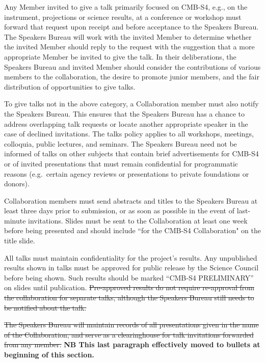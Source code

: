 \documentclass[12pt]{article}
\begin{document}
{\color{red}
Any Member invited to give a talk primarily focused on CMB-S4, e.g., on the instrument, projections or science results, at a conference or workshop must forward that request upon receipt and before acceptance to the Speakers Bureau.  The Speakers Bureau will work with the invited Member to determine whether the invited Member should reply to the request with the suggestion that a more appropriate Member be invited to give the talk. In their deliberations, the Speakers Bureau and invited Member should consider
the contributions of various members to the collaboration, the desire to promote junior members, and the fair distribution of opportunities to give talks.

To give talks not in the above category, a Collaboration member must also notify the Speakers Bureau. This ensures that the Speakers Bureau has a chance to address overlapping talk requests or locate another appropriate speaker in the case of declined invitations.  The talks policy applies to all workshops, meetings, colloquia, public lectures, and seminars.  The Speakers Bureau need not be informed of talks on other subjects that contain brief advertisements for CMB-S4 or of invited presentations that must remain confidential for programmatic reasons (e.g.~certain agency reviews or presentations to private foundations or donors).


Collaboration members must send abstracts and titles to the Speakers Bureau at least three days prior to submission, or as soon as possible in the event of last-minute invitations. Slides must be sent to the Collaboration at least one week before being presented and should include ``for the CMB-S4 Collaboration" on the title slide.

All talks must maintain confidentiality for the project's results.
Any unpublished results shown in talks must be approved for public release by the Science Council before being shown. Such results should be marked ``CMB-S4 PRELIMINARY'' on slides until publication.
\sout{Pre-approved results do not require re-approval from the collaboration for separate talks, although the Speakers Bureau still needs to be notified about the talk.}

\sout{The Speakers Bureau will maintain records of all presentations given in the name of the Collaboration, and serve as a clearinghouse for talk invitations forwarded from any member.} {\bf NB This last paragraph effectively moved to bullets at beginning of this section.}
}
\end{document}
